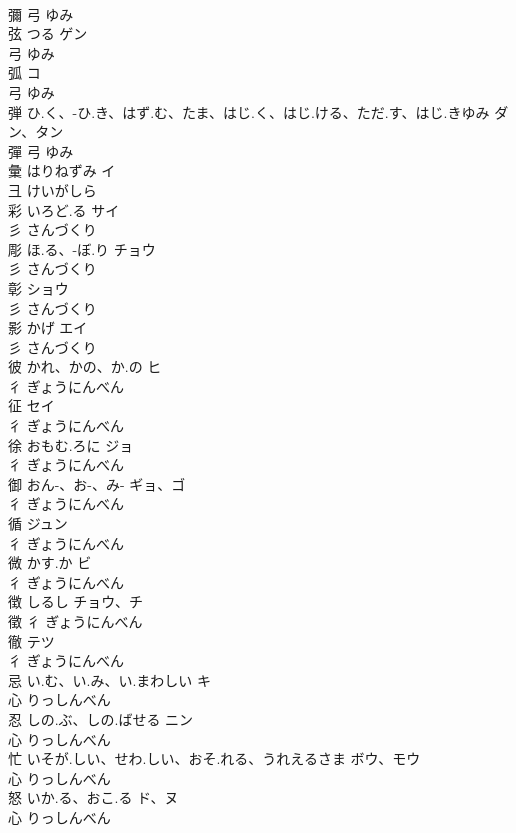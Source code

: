 \documentclass[8pt]{extreport}
\begin{document}
\begin{CJK}{UTF8}{min}
\\	彌	弓		ゆみ		
\\	弦	つる	ゲン	
\\	弓		ゆみ		
\\	弧		コ	
\\	弓		ゆみ		
\\	弾	ひ.く、-ひ.き、はず.む、たま、はじ.く、はじ.ける、ただ.す、はじ.きゆみ	ダン、タン	
\\	彈	弓		ゆみ		
\\	彙	はりねずみ	イ	
\\	彐		けいがしら		
\\	彩	いろど.る	サイ	
\\	彡		さんづくり		
\\	彫	ほ.る、-ぼ.り	チョウ	
\\	彡		さんづくり		
\\	彰		ショウ	
\\	彡		さんづくり		
\\	影	かげ	エイ	
\\	彡		さんづくり		
\\	彼	かれ、かの、か.の	ヒ	
\\	彳		ぎょうにんべん		
\\	征		セイ	
\\	彳		ぎょうにんべん		
\\	徐	おもむ.ろに	ジョ	
\\	彳		ぎょうにんべん		
\\	御	おん-、お-、み-	ギョ、ゴ	
\\	彳		ぎょうにんべん		
\\	循		ジュン	
\\	彳		ぎょうにんべん		
\\	微	かす.か	ビ	
\\	彳		ぎょうにんべん		
\\	徴	しるし	チョウ、チ	
\\	徵	彳		ぎょうにんべん		
\\	徹		テツ	
\\	彳		ぎょうにんべん		
\\	忌	い.む、い.み、い.まわしい	キ	
\\	心		りっしんべん		
\\	忍	しの.ぶ、しの.ばせる	ニン	
\\	心		りっしんべん		
\\	忙	いそが.しい、せわ.しい、おそ.れる、うれえるさま	ボウ、モウ	
\\	心		りっしんべん		
\\	怒	いか.る、おこ.る	ド、ヌ	
\\	心		りっしんべん		

\end{CJK}
\end{document}
